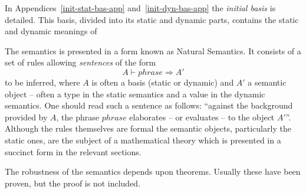 In Appendices~\ref{init-stat-bas-app} and~\ref{init-dyn-bas-app} 
the {\sl initial basis} is detailed.  This basis,
divided into its static and dynamic parts, contains the static and
dynamic meanings of 

The semantics is presented in a form  known as Natural
Semantics.  It consists of a set of rules allowing 
{\sl sentences} of the form
\[ A \vdash phrase \Rightarrow A' \]
to be inferred, where $A$ is often a basis (static or dynamic) and $A'$ a
semantic object
-- often a type in the static semantics and a value in the dynamic
semantics. One should read such a sentence as follows: ``against
the background provided by
$A$, the phrase $phrase$ elaborates -- or evaluates -- to the object
$A'$''.
Although the rules themselves are formal the semantic
objects, particularly the static ones, are the subject of a mathematical
theory which is presented in a succinct form in the relevant sections.

The robustness of the semantics depends upon theorems.  
Usually these have been proven, but the proof is not included.




